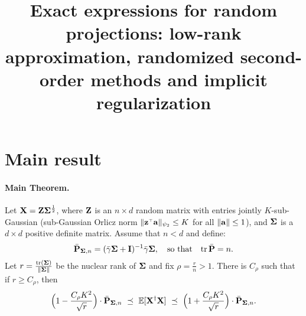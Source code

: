 \documentclass[11pt]{article}
\title{Exact expressions for random projections:
low-rank approximation, randomized second-order methods and implicit regularization}
\begin{document}
\maketitle

\section{Main result}
\paragraph{Main Theorem.}
Let $\mathbf X = \mathbf Z\mathbf{\Sigma}^{\frac12}$, where $\mathbf Z$ is an $n\times d$ random matrix with
entries jointly
$K$-sub-Gaussian (sub-Gaussian Orlicz norm
$\|\z^\top \a \|_{\psi_2} \leq K$ for all $\|\mathbf a\| \leq 1$),
and $\mathbf{\Sigma}$ is a $d\times d$
positive definite matrix. Assume that $n<d$ and define:
\begin{align*}
\bar{\mathbf P}_{\mathbf{\Sigma},n} = (\bar\gamma\mathbf{\Sigma} +
  \mathbf I)^{-1}\bar\gamma\mathbf{\Sigma},\quad\text{so that}\quad\mathrm{tr}\,\bar{\mathbf P}=n. 
\end{align*}
Let $r=\frac{\mathrm{tr}(\mathbf{\Sigma})}{\|\mathbf{\Sigma}\|}$ be the nuclear rank of
$\mathbf{\Sigma}$ and fix $\rho=\frac rn > 1$. There is $C_{\rho}$ such that if $r\geq C_\rho$, then
\begin{align}
\Big(1-\frac {C_\rho K^2}{\sqrt
  r}\Big)\cdot\bar\P_{\Sigmab,n}\ \preceq\ \E[\X^\dagger\X]\ \preceq\ 
  \Big(1+\frac {C_\rho K^2}{\sqrt r}\Big)\cdot\bar\P_{\Sigmab,n}.
\end{align}
\end{document}
